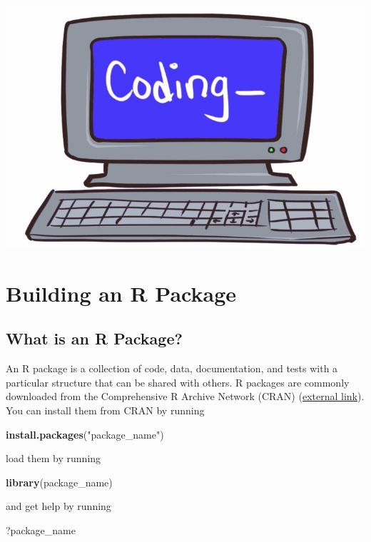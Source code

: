 \documentclass[
]{book}
\newenvironment{Shaded}{\begin{snugshade}}{\end{snugshade}}
\newcommand{\KeywordTok}[1]{\textcolor[rgb]{0.13,0.29,0.53}{\textbf{#1}}}
\newcommand{\NormalTok}[1]{#1}
\newcommand{\StringTok}[1]{\textcolor[rgb]{0.31,0.60,0.02}{#1}}
\begin{document}
\begin{center}\includegraphics[width=0.5\linewidth]{images/coding} \end{center}

\hypertarget{r-package}{%
\chapter{Building an R Package}\label{r-package}}

\hypertarget{what-is-an-r-package}{%
\section{What is an R Package?}\label{what-is-an-r-package}}

An R package is a collection of code, data, documentation, and tests with a particular structure that can be shared with others. R packages are commonly downloaded from the Comprehensive R Archive Network (CRAN) (\href{https://cran.r-project.org/}{external link}). You can install them from CRAN by running

\begin{Shaded}
\begin{Highlighting}[]
\KeywordTok{install.packages}\NormalTok{(}\StringTok{"package_name"}\NormalTok{)}
\end{Highlighting}
\end{Shaded}

load them by running

\begin{Shaded}
\begin{Highlighting}[]
\KeywordTok{library}\NormalTok{(package_name)}
\end{Highlighting}
\end{Shaded}

and get help by running

\begin{Shaded}
\begin{Highlighting}[]
\NormalTok{?package_name}
\end{Highlighting}
\end{Shaded}
\end{document}
